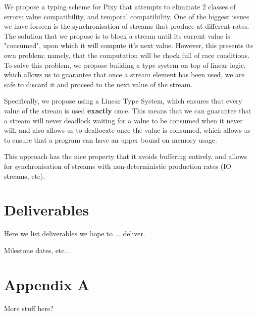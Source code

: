 \documentclass{scrartcl}
\begin{document}
    We propose a typing scheme for Pixy that attempts to eliminate 2 classes of errors: value compatibility, and 
    temporal compatibility. One of the biggest issues we have forseen is the synchronisation of streams that produce at different rates.
    The solution that we propose is to block a stream until its current value is "consumed", upon which it will compute it's next value.
    However, this presents its own problem: namely, that the computation will be chock full of race conditions.
    To solve this problem, we propose building a type system on top of linear logic, which allows us to guarantee that once a stream element 
    has been used, we are safe to discard it and proceed to the next value of the stream.
    
    Specifically, we propose using a Linear Type System, which ensures that every value of the stream is used \textbf{exactly} once.
    This means that we can guarantee that a stream will never deadlock waiting for a value to be consumed when it never will, and also
    allows us to deallocate once the value is consumed, which allows us to ensure that a program can have an upper bound on memory usage.

    This approach has the nice property that it avoids buffering entirely, and allows for synchronisation of streams with non-deterministic production rates
    (IO streams, etc).
    
    
    
    \section{Deliverables}
    
    Here we list deliverables we hope to ... deliver.
    
    Milestone dates, etc...
    
    \appendix
    
    \section{Appendix A}
    
    More stuff here?
\end{document}
